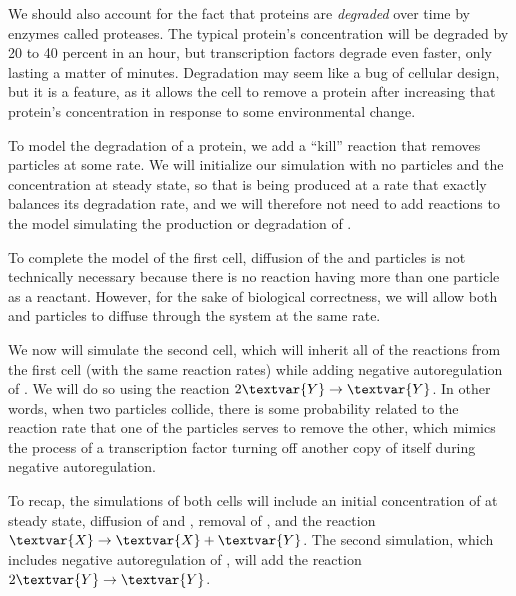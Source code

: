 We should also account for the fact that proteins are \textit{degraded} over time by enzymes called proteases. The typical protein's concentration will be degraded by 20 to 40 percent in an hour, but transcription factors degrade even faster, only lasting a matter of minutes. Degradation may seem like a bug of cellular design, but it is a feature, as it allows the cell to remove a protein after increasing that protein's concentration in response to some environmental change.

To model the degradation of a protein, we add a ``kill'' reaction that removes  particles at some rate. We will initialize our simulation with no  particles and the  concentration at steady state, so that  is being produced at a rate that exactly balances its degradation rate, and we will therefore not need to add reactions to the model simulating the production or degradation of .

To complete the model of the first cell, diffusion of the  and  particles is not technically necessary because there is no reaction having more than one particle as a reactant. However, for the sake of biological correctness, we will allow both  and  particles to diffuse through the system at the same rate.\\

\begin{qbox}\end{qbox}

We now will simulate the second cell, which will inherit all of the reactions from the first cell (with the same reaction rates) while adding negative autoregulation of . We will do so using the reaction $2\textvar{Y} \rightarrow \textvar{Y}$. In other words, when two  particles collide, there is some probability related to the reaction rate that one of the particles serves to remove the other, which mimics the process of a transcription factor turning off another copy of itself during negative autoregulation.

To recap, the simulations of both cells will include an initial concentration of  at steady state, diffusion of  and , removal of , and the reaction $\textvar{X} \rightarrow \textvar{X} + \textvar{Y}$. The second simulation, which includes negative autoregulation of , will add the reaction $2\textvar{Y} \rightarrow \textvar{Y}$. \\

